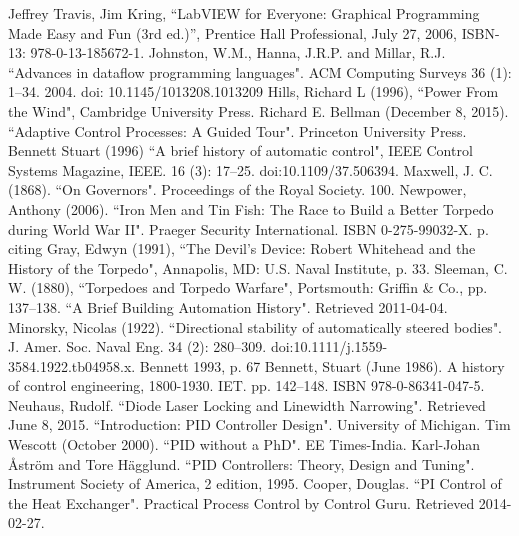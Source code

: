 
\begin{thebibliography}{99}

 Jeffrey Travis, Jim Kring, “LabVIEW for Everyone: Graphical Programming Made Easy and Fun (3rd ed.)”, Prentice Hall Professional, July 27, 2006, ISBN-13: 978-0-13-185672-1.
 Johnston, W.M., Hanna, J.R.P. and Millar, R.J. ``Advances in dataflow programming languages". ACM Computing Surveys 36 (1): 1–34. 2004. doi: 10.1145/1013208.1013209
 Hills, Richard L (1996), ``Power From the Wind", Cambridge University Press.
 Richard E. Bellman (December 8, 2015). ``Adaptive Control Processes: A Guided Tour". Princeton University Press.
 Bennett Stuart (1996) ``A brief history of automatic control", IEEE Control Systems Magazine, IEEE. 16 (3): 17–25. doi:10.1109/37.506394.
 Maxwell, J. C. (1868). ``On Governors". Proceedings of the Royal Society. 100.
 Newpower, Anthony (2006). ``Iron Men and Tin Fish: The Race to Build a Better Torpedo during World War II". Praeger Security International. ISBN 0-275-99032-X. p.  citing Gray, Edwyn (1991), ``The Devil's Device: Robert Whitehead and the History of the Torpedo", Annapolis, MD: U.S. Naval Institute, p. 33.
 Sleeman, C. W. (1880), ``Torpedoes and Torpedo Warfare", Portsmouth: Griffin \& Co., pp. 137–138.
 ``A Brief Building Automation History". Retrieved 2011-04-04.
 Minorsky, Nicolas (1922). ``Directional stability of automatically steered bodies". J. Amer. Soc. Naval Eng. 34 (2): 280–309. doi:10.1111/j.1559-3584.1922.tb04958.x.
 Bennett 1993, p. 67
 Bennett, Stuart (June 1986). A history of control engineering, 1800-1930. IET. pp. 142–148. ISBN 978-0-86341-047-5.
 Neuhaus, Rudolf. ``Diode Laser Locking and Linewidth Narrowing". Retrieved June 8, 2015.
 ``Introduction: PID Controller Design". University of Michigan.
 Tim Wescott (October 2000). ``PID without a PhD". EE Times-India.
 Karl-Johan Åström and Tore Hägglund. ``PID Controllers: Theory, Design and Tuning". Instrument Society of America, 2 edition, 1995.
 Cooper, Douglas. ``PI Control of the Heat Exchanger". Practical Process Control by Control Guru. Retrieved 2014-02-27.

\end{thebibliography}
